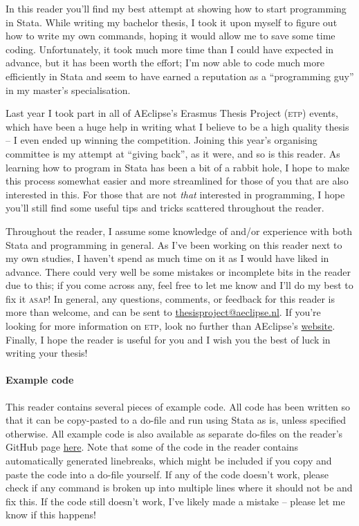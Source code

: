 In this reader you'll find my best attempt at showing how to start programming in Stata.
While writing my bachelor thesis,
I took it upon myself to figure out how to write my own commands,
hoping it would allow me to save some time coding.
Unfortunately, it took much more time than I could have expected in advance,
but it has been worth the effort;
I'm now able to code much more efficiently in Stata and seem to have earned a reputation as a ``programming guy'' in my master's specialisation.

Last year I took part in all of AEclipse's Erasmus Thesis Project (\textsc{etp}) events,
which have been a huge help in writing what I believe to be a high quality thesis --
I even ended up winning the competition.
Joining this year's organising committee is my attempt at ``giving back'',
as it were,
and so is this reader.
As learning how to program in Stata has been a bit of a rabbit hole,
I hope to make this process somewhat easier and more streamlined for those of you that are also interested in this.
For those that are not \emph{that} interested in programming,
I hope you'll still find some useful tips and tricks scattered throughout the reader.

Throughout the reader,
I assume some knowledge of and/or experience with both Stata and programming in general.
As I've been working on this reader next to my own studies,
I haven't spend as much time on it as I would have liked in advance.
There could very well be some mistakes or incomplete bits in the reader due to this;
if you come across any, feel free to let me know and I'll do my best to fix it \textsc{asap}!
In general, any questions, comments,
or feedback for this reader is more than welcome,
and can be sent to \href{mailto:thesisproject@aeclipse.nl}{thesisproject@aeclipse.nl}.
If you're looking for more information on \textsc{etp}, look no further than AEclipse's \href{https://www.aeclipse.nl/etp}{website}.
Finally, I hope the reader is useful for you and I wish you the best of luck in writing your thesis!

\paragraph{Example code}
This reader contains several pieces of example code.
All code has been written so that it can be copy-pasted to a do-file and run using Stata as is,
unless specified otherwise.
All example code is also available as separate do-files on the reader's GitHub page \href{https://github.com/Ahvns/ETPreader/tree/main/Example%20do-files}{here}.
Note that some of the code in the reader contains automatically generated linebreaks,
which might be included if you copy and paste the code into a do-file yourself.
If any of the code doesn't work,
please check if any command is broken up into multiple lines where it should not be and fix this.
If the code still doesn't work, I've likely made a mistake --
please let me know if this happens!

